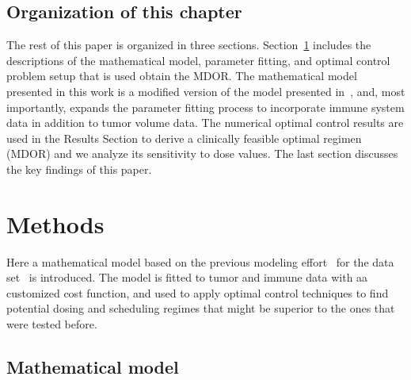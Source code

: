 \subsection{Organization of this chapter}
The rest of this paper is organized in three sections. Section~\ref{sec:methods} includes the descriptions of the mathematical model, parameter fitting, and optimal control problem setup that is used obtain the \ac{MDOR}. The mathematical model presented in this work is a modified version of the model presented in~\cite{tran2020delicate}, and, most importantly, expands the parameter fitting process to incorporate immune system data in addition to tumor volume data. The numerical optimal control results are used in the Results Section to derive a clinically feasible optimal regimen (\ac{MDOR}) and we analyze its sensitivity to dose values. The last section discusses the key findings of this paper.

\section{Methods}
\label{sec:methods}

Here a mathematical model based on the previous modeling effort~\cite{tran2020delicate} for the data set~\cite{wu2014metronomic} is introduced. The model is fitted to tumor and immune data with aa customized cost function, and used to apply optimal control techniques to find potential dosing and scheduling regimes that might be superior to the ones that were tested before. 

\subsection{Mathematical model}

